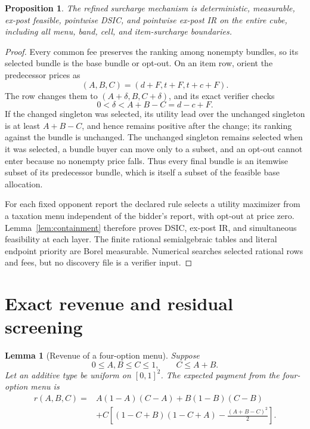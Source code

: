 \documentclass[11pt]{article}
\newtheorem{lemma}[theorem]{Lemma}
\newtheorem{proposition}[theorem]{Proposition}
\begin{document}
\begin{proposition}\label{prop:surcharge-valid}
The refined surcharge mechanism is deterministic, measurable, ex-post
feasible, pointwise DSIC, and pointwise ex-post IR on the entire cube,
including all menu, band, cell, and item-surcharge boundaries.
\end{proposition}

\begin{proof}
Every common fee preserves the ranking among nonempty bundles, so its selected
bundle is the base bundle or opt-out.  On an item row, orient the predecessor
prices as
\[
(A,B,C)=(d+F,t+F,t+c+F).
\]
The row changes them to \((A+\delta,B,C+\delta)\), and its exact verifier
checks
\[
0<\delta<A+B-C=d-c+F.
\]
If the changed singleton was selected, its utility lead over the unchanged
singleton is at least \(A+B-C\), and hence remains positive after the change;
its ranking against the bundle is unchanged.  The unchanged singleton remains
selected when it was selected, a bundle buyer can move only to a subset, and
an opt-out cannot enter because no nonempty price falls.  Thus every final
bundle is an itemwise subset of its predecessor bundle, which is itself a
subset of the feasible base allocation.

For each fixed opponent report the declared rule selects a utility maximizer
from a taxation menu independent of the bidder's report, with opt-out at
price zero.  Lemma~\ref{lem:containment} therefore proves DSIC, ex-post IR,
and simultaneous feasibility at each layer.  The finite rational
semialgebraic tables and literal endpoint priority are Borel measurable.
Numerical searches selected rational rows and fees, but no discovery file is a
verifier input.
\end{proof}

\section{Exact revenue and residual screening}\label{sec:revenue}

\begin{lemma}[Revenue of a four-option menu]\label{lem:menu-revenue}
Suppose
\[
0\leq A,B\leq C\leq1,\qquad C\leq A+B.
\]
Let an additive type be uniform on \([0,1]^2\).  The expected payment from
the four-option menu is
\[
\begin{split}
r(A,B,C)={}&A(1-A)(C-A)+B(1-B)(C-B)\\
&+C\left[(1-C+B)(1-C+A)-\frac{(A+B-C)^2}{2}\right].
\end{split}
\]
\end{lemma}
\end{document}
